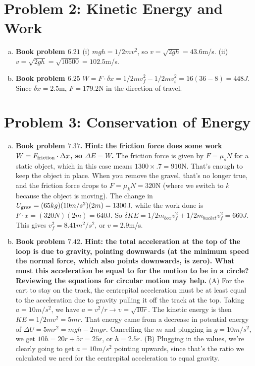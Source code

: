 \documentclass[10pt,letter]{article}
\begin{document}
\section*{Problem 2: Kinetic Energy and Work }
\begin{enumerate}[(a)]
\item {\bf Book problem $6.21$}
(i) $mgh = 1/2 m v^2$, so $v = \sqrt{2gh} = 43.6$m/s.
(ii) $v = \sqrt{2gh} = \sqrt{10500} = 102.5$m/s.
\item {\bf Book problem $6.25$}
$W = F \cdot \delta x = 1/2 m v_f^2 - 1/2 m v_i^2 = 16 ( 36 - 8 ) = 448 J$. Since $\delta x = 2.5$m, $F = 179.2$N in the direction of travel.
\end{enumerate}
\section*{Problem 3: Conservation of Energy}
\begin{enumerate}[(a)]
\item {\bf Book problem $7.37$. Hint: the friction force does some work $W = F_{\rm friction} \cdot \Delta x$, so $\Delta E = W$.}
The friction force is given by $F = \mu_s N$ for a static object, which in this case means $1300 \times .7 = 910$N. That's enough to keep the object in place. When you remove the gravel, that's no longer true, and the friction force drops to $F = \mu_k N = 320$N (where we switch to $k$ because the object is moving). The change in $U_{\rm grav} = (65kg)(10m/s^2)(2m) = 1300$J, while the work done is $F \cdot x = (320N)(2m) = 640$J. So $\delta KE = 1/2 m_{box} v_f^2 + 1/2 m_{bucket} v_f^2 = 660J$. This gives $v_f^2 = 8.41 m^2/s^2$, or $v = 2.9$m/s.
\item {\bf Book problem $7.42$. Hint: the total acceleration at the top of the loop is due to gravity, pointing downwards (at the minimum speed the normal force, which also points downwards, is zero). What must this acceleration be equal to for the motion to be in a circle? Reviewing the equations for circular motion may help.}
(A) For the cart to stay on the track, the centrepital acceleration must be at least equal to the acceleration due to gravity pulling it off the track at the top. Taking $a = 10m/s^2$, we have $a = v^2/r \rightarrow v = \sqrt{10r}$. The kinetic energy is then $KE = 1/2 m v^2 = 5mr$. That energy came from a decrease in potential energy of $\Delta U = 5 mr^2 = mgh - 2mgr$. Cancelling the $m$ and plugging in $g = 10m/s^2$, we get $10h = 20 r + 5 r = 25 r$, or $h = 2.5 r$. 
(B) Plugging in the values, we're clearly going to get $a = 10m/s^2$ pointing upwards, since that's the ratio we calculated we need for the centrepital acceleration to equal gravity.
\end{enumerate}
\end{document}
